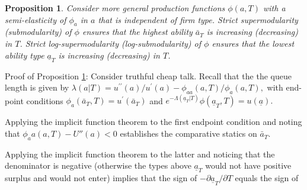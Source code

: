 \documentclass[12pt]{article}
\newtheorem{prop}{Proposition}
\begin{document}
\begin{prop}
\label{extension} Consider more general production functions $\phi (a,T)$ with a semi-elasticity of $\phi_a$ in $a$ that is independent of firm type. Strict supermodularity (submodularity) of $\phi$ ensures that the highest ability $\bar{a}_T$ is increasing (decreasing) in $T$. Strict log-supermodularity (log-submodularity) of $\phi $ ensures that the
lowest ability type $\underline{a}_T$ is increasing (decreasing) in $T$.
\end{prop}

\noindent Proof of Proposition \ref{extension}: Consider truthful cheap talk. Recall that the the queue length is given by $\lambda(a|T)=u^{\prime
\prime }(a)/u^{\prime }(a)-\phi _{aa}(a,T)/\phi _{a}(a,T),$ with
end-point conditions $\phi _{a}(\bar{a}_T,T)=u^{\prime }(\bar{a}_{T})$ and $%
e^{-\Lambda (\underline{a}_{T}|T)}\phi(\underline{a}_T,T)=u(\underline{a}%
).$ 

Applying the implicit function theorem to the first endpoint condition and noting that $\phi_aa(a,T)-U''(a)<0$ establishes the comparative statics on $\bar{a}_T$.


Applying the implicit function theorem to the latter and noticing that the denominator is negative (otherwise the types above $\underline{a}_T$ would not have positive surplus and would not enter) implies that the sign of $- \partial \underline{a}_T/\partial T$ equals the sign of
\end{document}
